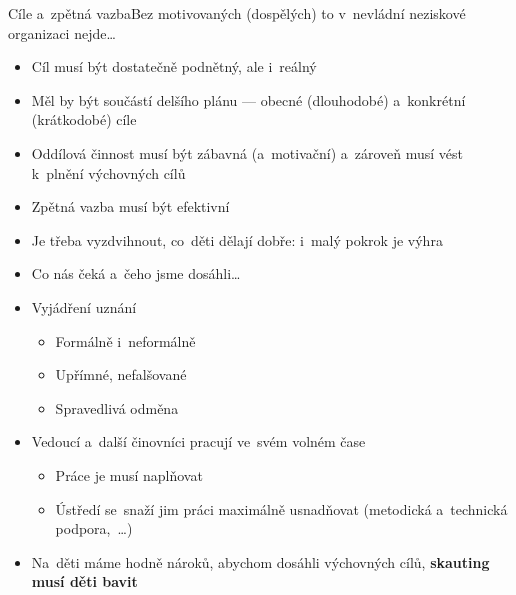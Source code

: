 \documentclass[compress, xelatex, 11pt, xcolor=dvipsnames, print, aspectratio=169,
	hyperref={
		bookmarks=true,
		unicode=true,
		colorlinks=true,
		pdftitle={Skautska vychovna metoda},
		plainpages=false,
		pdfauthor={Vojtech Zeisek},
		pdfsubject={Skautska vychovna metoda a jeji vyvoj za posledni stoleti a desetileti},
		pdfcreator={XeLaTeX},
		pdfkeywords={Junak, Pedagogika, Skaut, Skauting, Vychovna metoda},
		linkcolor=Red, %
		anchorcolor=ForestGreen, %
		citecolor=ForestGreen, %
		filecolor=ForestGreen, %
		menucolor=ForestGreen, %
		urlcolor=Sepia, %
		pdftex},
	url={hyphens, lowtilde} %
	]{beamer}
\begin{document}
\begin{frame}{Cíle a~zpětná vazba}{Bez motivovaných (dospělých) to v~nevládní neziskové organizaci nejde\ldots}
	\begin{multicols}{2}
		\begin{itemize}
			\item Cíl musí být dostatečně podnětný, ale i~reálný
			\item Měl by být součástí delšího plánu --- obecné (dlouhodobé) a~konkrétní (krátkodobé) cíle
			\item Oddílová činnost musí být zábavná (a~motivační) a~zároveň musí vést k~plnění výchovných cílů
			\item Zpětná vazba musí být efektivní
			\item Je třeba vyzdvihnout, co~děti dělají dobře: i~malý pokrok je výhra
			\item Co nás čeká a~čeho jsme dosáhli\ldots
			\item Vyjádření uznání
			\begin{itemize}
				\item Formálně i~neformálně
				\item Upřímné, nefalšované
				\item Spravedlivá odměna
			\end{itemize}
		\end{itemize}
	\end{multicols}
	\begin{itemize}
		\item Vedoucí a~další činovníci pracují ve~svém volném čase
		\begin{itemize}
			\item Práce je musí naplňovat
			\item Ústředí se~snaží jim práci maximálně usnadňovat (metodická a~technická podpora,~\ldots)
		\end{itemize}
		\item Na~děti máme hodně nároků, abychom dosáhli výchovných cílů, \textbf{skauting musí děti bavit}
	\end{itemize}
\end{frame}
\end{document}
